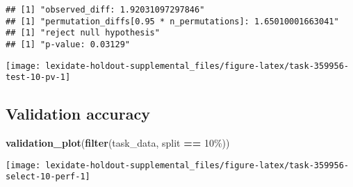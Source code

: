 \documentclass[
]{book}
\newenvironment{Shaded}{\begin{snugshade}}{\end{snugshade}}
\newcommand{\AttributeTok}[1]{\textcolor[rgb]{0.13,0.29,0.53}{#1}}
\newcommand{\DecValTok}[1]{\textcolor[rgb]{0.00,0.00,0.81}{#1}}
\newcommand{\FunctionTok}[1]{\textcolor[rgb]{0.13,0.29,0.53}{\textbf{#1}}}
\newcommand{\NormalTok}[1]{#1}
\newcommand{\OtherTok}[1]{\textcolor[rgb]{0.56,0.35,0.01}{#1}}
\newcommand{\SpecialCharTok}[1]{\textcolor[rgb]{0.81,0.36,0.00}{\textbf{#1}}}
\newcommand{\StringTok}[1]{\textcolor[rgb]{0.31,0.60,0.02}{#1}}
\begin{document}
\begin{Shaded}
\end{Shaded}

\begin{verbatim}
## [1] "observed_diff: 1.92031097297846"
## [1] "permutation_diffs[0.95 * n_permutations]: 1.65010001663041"
## [1] "reject null hypothesis"
## [1] "p-value: 0.03129"
\end{verbatim}

\texttt{[image: lexidate-holdout-supplemental\_files/figure-latex/task-359956-test-10-pv-1]}

\hypertarget{validation-accuracy-26}{%
\subsection{Validation accuracy}\label{validation-accuracy-26}}

\begin{Shaded}
\begin{Highlighting}[]
\FunctionTok{validation\_plot}\NormalTok{(}\FunctionTok{filter}\NormalTok{(task\_data, split }\SpecialCharTok{==} \StringTok{\textquotesingle{}10\%\textquotesingle{}}\NormalTok{))}
\end{Highlighting}
\end{Shaded}

\texttt{[image: lexidate-holdout-supplemental\_files/figure-latex/task-359956-select-10-perf-1]}
\end{document}

